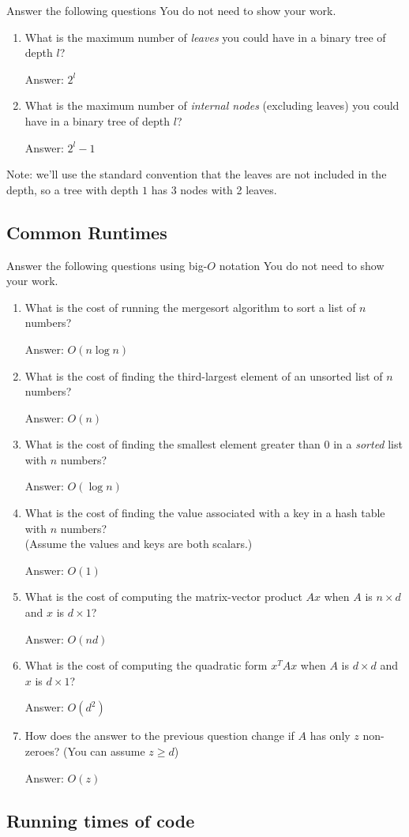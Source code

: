 \documentclass{article}
\def\ans#1{\par\gre{Answer: #1}}
\def\blu#1{{\color{blu}#1}}
\def\gre#1{{\color{gre}#1}}
\begin{document}
\blu{Answer the following questions} You do not need to show your work.
\begin{enumerate}
\item What is the maximum number of \emph{leaves} you could have in a binary tree of depth $l$?
\ans{$2^{l}$}
\item What is the maximum number of \emph{internal nodes} (excluding leaves) you could have in a binary tree of depth $l$?
\ans{$2^{l}-1$}
\end{enumerate}
Note: we'll use the standard convention that the leaves are not included in the depth, so a tree with depth $1$ has 3 nodes with 2 leaves.


\subsection{Common Runtimes}

\blu{Answer the following questions using big-$O$ notation} You do not need to show your work.
\begin{enumerate}
\item What is the cost of running the mergesort algorithm to sort  a list of $n$ numbers?
\ans{$O(n\log n)$}
\item What is the cost of finding the third-largest element of an unsorted list of $n$ numbers?
\ans{$O(n)$}
\item What is the cost of finding the smallest element greater than 0 in a \emph{sorted} list with $n$ numbers?
\ans{$O(\log n)$}
\item What is the cost of finding the value associated with a key in a hash table with $n$ numbers? \\(Assume the values and keys are both scalars.)
\ans{$O(1)$}
\item What is the cost of computing the matrix-vector product $Ax$ when $A$ is $n \times d$ and $x$ is $d \times 1$?
\ans{$O(nd)$}
\item What is the cost of computing the quadratic form $x^TAx$ when $A$ is $d \times d$ and $x$ is $d \times 1$?
\ans{$O(d^2)$}
\item How does the answer to the previous question change if $A$ has only $z$ non-zeroes? (You can assume $z \geq d$)
\ans{$O(z)$}
\end{enumerate}

\subsection{Running times of code}
\end{document}
